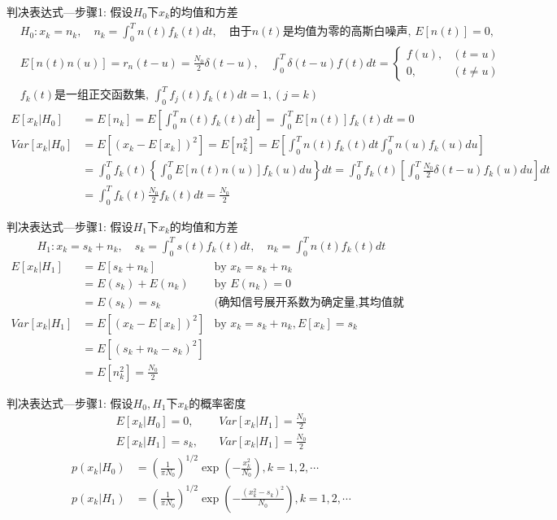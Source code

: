 \begin{frame}[shrink]{判决表达式---步骤1: 假设$H_0$下$x_k$的均值和方差}
\begin{align*}
&H_0: x_k=n_k, \quad n_k=\int_{0}^{T}n(t)f_k(t)dt, \quad\text{由于$n(t)$是均值为零的高斯白噪声, } E[n(t)]=0,\\
&E[n(t)n(u)]=r_n(t-u)=\frac{N_0}{2}\delta(t-u), \quad
\int_0^T\delta(t-u)f(t)dt=
\begin{cases}
f(u), & (t=u)\\
0, & (t\ne u) 
\end{cases}\\
&\text{$f_k(t)$是一组正交函数集, } \int_{0}^{T}f_j(t)f_k(t)dt=1,(j=k)
\end{align*}
\begin{align*}
E[x_k|H_0]&=E[n_k]=E\left[\int_{0}^{T}n(t)f_k(t)dt\right]=\int_{0}^{T}E[n(t)]f_k(t)dt=0\\
Var[x_k|H_0]&=E[(x_k-E[x_k])^2]=E[n_k^2]=E\left[\int_{0}^{T}n(t)f_k(t)dt\int_{0}^{T}n(u)f_k(u)du\right]\\
&=\int_{0}^{T}f_k(t)\left\{\int_{0}^{T}E[n(t)n(u)]f_k(u)du\right\}dt=\int_{0}^{T}f_k(t)\left[\int_{0}^{T}\frac{N_0}{2}\delta(t-u)f_k(u)du\right]dt\\
&=\int_{0}^{T}f_k(t)\frac{N_0}{2}f_k(t)dt=\frac{N_0}{2}
\end{align*}
\end{frame}

\begin{frame}[shrink]{判决表达式---步骤1: 假设$H_1$下$x_k$的均值和方差}
\begin{align*}
H_1: x_k=s_k+n_k, \quad s_k=\int_{0}^{T}s(t)f_k(t)dt, \quad n_k=\int_{0}^{T}n(t)f_k(t)dt
\end{align*}
\begin{align*}
E[x_k|H_1]&=E[s_k+n_k]&\text{by }x_k=s_k+n_k \\
&=E(s_k)+E(n_k)&\text{by }E(n_k)=0 \\
&=E(s_k)=s_k&\text{(确知信号展开系数为确定量,其均值就是本身)}\\
Var[x_k|H_1]&=E[(x_k-E[x_k])^2]&\text{by }x_k=s_k+n_k,E[x_k]=s_k\\
&=E[(s_k+n_k-s_k)^2]&\\
&=E[n_k^2]=\frac{N_0}{2}&
\end{align*}
\end{frame}

\begin{frame}[shrink]{判决表达式---步骤1: 假设$H_0,H_1$下$x_k$的概率密度}
\begin{align*}
E[x_k|H_0]=0,   &\quad Var[x_k|H_1]=\frac{N_0}{2}\\
E[x_k|H_1]=s_k, &\quad Var[x_k|H_1]=\frac{N_0}{2}
\end{align*}
\begin{align*}
p(x_k|H_0)&=\left(\frac{1}{\pi N_0}\right)^{1/2}\exp\left(-\frac{x_k^2}{N_0}\right), k=1,2,\cdots\\
p(x_k|H_1)&=\left(\frac{1}{\pi N_0}\right)^{1/2}\exp\left(-\frac{(x_k^2-s_k)^2}{N_0}\right), k=1,2,\cdots
\end{align*}
\end{frame}


